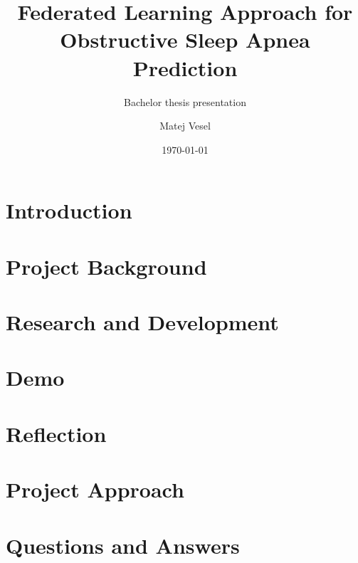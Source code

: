 \documentclass{beamer}
\title{Federated Learning Approach for Obstructive Sleep Apnea Prediction}
\subtitle{Bachelor thesis presentation}
\author{Matej Vesel}
\institute{UC Leuven Limburg \& Result d.o.o}
\date{\today}
\begin{document}



\section{Introduction}
\section{Project Background}
\section{Research and Development}
\section{Demo}
\section{Reflection}
\section{Project Approach}

\section{Questions and Answers}
\end{document}
